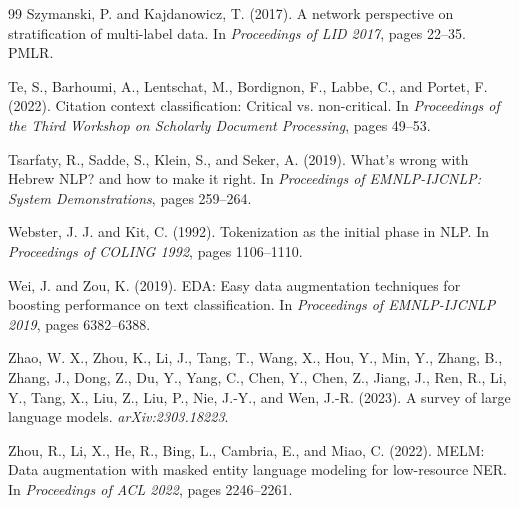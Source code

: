 \documentclass[11pt,a4paper]{article}
\begin{document}
\begin{thebibliography}{99}
Szymanski, P. and Kajdanowicz, T. (2017).
A network perspective on stratification of multi-label data.
In \emph{Proceedings of LID 2017}, pages 22--35. PMLR.

Te, S., Barhoumi, A., Lentschat, M., Bordignon, F., Labbe, C., and Portet, F. (2022).
Citation context classification: Critical vs. non-critical.
In \emph{Proceedings of the Third Workshop on Scholarly Document Processing}, pages 49--53.

Tsarfaty, R., Sadde, S., Klein, S., and Seker, A. (2019).
What's wrong with Hebrew NLP? and how to make it right.
In \emph{Proceedings of EMNLP-IJCNLP: System Demonstrations}, pages 259--264.

Webster, J. J. and Kit, C. (1992).
Tokenization as the initial phase in NLP.
In \emph{Proceedings of COLING 1992}, pages 1106--1110.

Wei, J. and Zou, K. (2019).
EDA: Easy data augmentation techniques for boosting performance on text classification.
In \emph{Proceedings of EMNLP-IJCNLP 2019}, pages 6382--6388.

Zhao, W. X., Zhou, K., Li, J., Tang, T., Wang, X., Hou, Y., Min, Y., Zhang, B., Zhang, J., Dong, Z., Du, Y., Yang, C., Chen, Y., Chen, Z., Jiang, J., Ren, R., Li, Y., Tang, X., Liu, Z., Liu, P., Nie, J.-Y., and Wen, J.-R. (2023).
A survey of large language models.
\emph{arXiv:2303.18223}.

Zhou, R., Li, X., He, R., Bing, L., Cambria, E., and Miao, C. (2022).
MELM: Data augmentation with masked entity language modeling for low-resource NER.
In \emph{Proceedings of ACL 2022}, pages 2246--2261.

\end{thebibliography}
\end{document}
